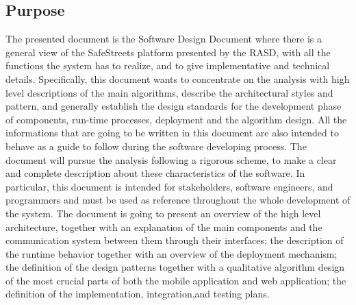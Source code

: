 \documentclass[12pt]{article}
\begin{document}
\subsection{Purpose}
\vspace{5mm}
The presented document is the Software Design Document where there is a general view of the SafeStreets platform presented by the
RASD, with all the functions the system has to realize, and to give implementative and technical details. Specifically, this document wants to concentrate on the analysis with high level descriptions of the main algorithms, describe
the architectural styles and pattern, and generally establish the design standards for the development phase of components, run-time processes, deployment and the algorithm design. All the informations that are going to be written in this document are also intended to behave as a guide to
follow during the software developing process.
The document will pursue the analysis following a rigorous scheme, to make a clear and complete description about these characteristics of the software.
In particular, this document is intended for stakeholders, software engineers, and programmers and must be used as reference throughout the whole development of the system. The document is going to present an overview of the high level architecture, together with an explanation of the main components and the communication system between them through their interfaces; the description of the runtime behavior together with an overview of the deployment mechanism; the definition of the design patterns together with a qualitative algorithm design of the most crucial parts of both the mobile application and web application; the definition of the implementation, integration,and testing plans.
\end{document}
